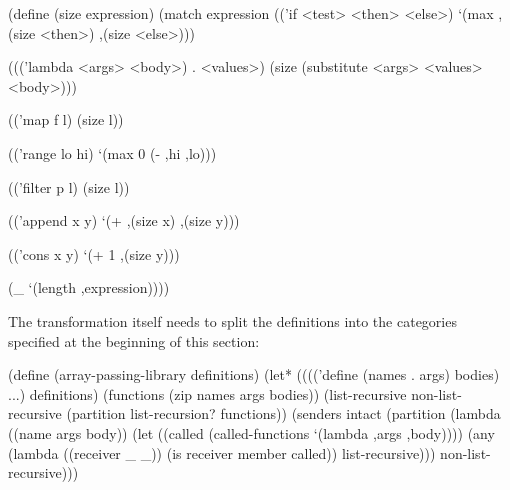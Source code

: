 \begin{Snippet}
(define (size expression)
  (match expression
    (('if <test> <then> <else>)
     `(max ,(size <then>) ,(size <else>)))
\end{Snippet}
\begin{Snippet}
    ((('lambda <args> <body>) . <values>)
     (size (substitute <args> <values> <body>)))
\end{Snippet}
\begin{Snippet}
    (('map f l)
     (size l))
\end{Snippet}
\begin{Snippet}
    (('range lo hi)
     `(max 0 (- ,hi ,lo)))
\end{Snippet}
\begin{Snippet}
    (('filter p l)
     (size l))
\end{Snippet}
\begin{Snippet}
    (('append x y)
     `(+ ,(size x) ,(size y)))
\end{Snippet}
\begin{Snippet}
    (('cons x y)
     `(+ 1 ,(size y)))
\end{Snippet}
\begin{Snippet}
    (_
     `(length ,expression))))
\end{Snippet}

The transformation itself needs to split the definitions into the categories
specified at the beginning of this section:

\begin{Snippet}
(define (array-passing-library definitions)
  (let* (((('define (names . args) bodies) ...) definitions)
	 (functions (zip names args bodies))
	 (list-recursive non-list-recursive
			 (partition list-recursion? functions))
	 (senders intact
		  (partition (lambda ((name args body))
			       (let ((called (called-functions
                                               `(lambda ,args
                                                  ,body))))
				 (any (lambda ((receiver _ _))
                                           (is receiver member called))
				      list-recursive)))
			     non-list-recursive)))
\end{Snippet}

